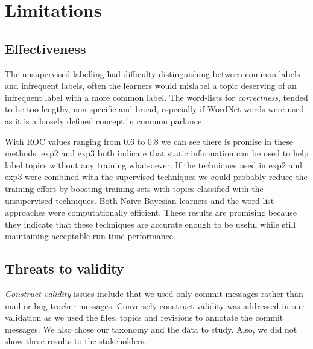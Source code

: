 \documentclass[]{sig-alternate}
\begin{document}
\section{Limitations}
\label{sec:limit}
\subsection{Effectiveness}

The unsupervised labelling had difficulty distinguishing between common labels and infrequent labels, often the learners would mislabel a topic deserving of an infrequent label with a more common label.
The word-lists for \emph{correctness}, tended to be too lengthy, non-specific and broad, especially if WordNet words were used as it is a loosely defined concept in common parlance.

With ROC values ranging from $0.6$ to $0.8$ we can see there is promise in these methods.
\textsf{exp2} and \textsf{exp3} both indicate that static information can be used to help label topics without any training whatsoever. 
If the techniques used in \textsf{exp2} and \textsf{exp3} were combined with the supervised techniques we could probably reduce the training effort by boosting training sets with topics classified with the unsupervised techniques.
Both Naive Bayesian learners and the word-list approaches were computationally efficient.  
These results are promising because they indicate that these techniques are accurate enough to be useful while still maintaining acceptable run-time performance.


\subsection{Threats to validity}


\emph{Construct validity} issues include that we used only commit messages rather than mail or bug tracker messages. 
Conversely construct validity was addressed in our validation as we used the files, topics and revisions to annotate the commit messages.
We also chose our taxonomy and the data to study. Also, we did not show these results to the stakeholders.
\end{document}
